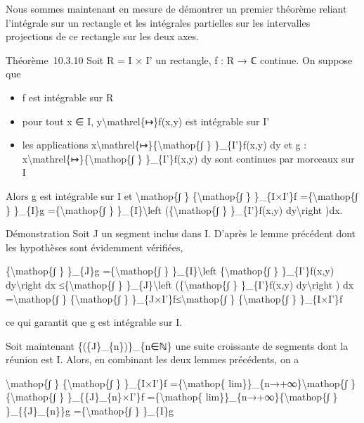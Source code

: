 \documentclass[]{article}
\begin{document}
Nous sommes maintenant en mesure de démontrer un premier théorème
reliant l'intégrale sur un rectangle et les intégrales partielles sur
les intervalles projections de ce rectangle sur les deux axes.

Théorème~10.3.10 Soit R = I × I' un rectangle, f : R → ℂ continue. On
suppose que

\begin{itemize}
\itemsep1pt\parskip0pt
\item
  f est intégrable sur R
\item
  pour tout x ∈ I, y\textbackslash{}mathrel\{↦\}f(x,y) est intégrable
  sur I'
\item
  les applications
  x\textbackslash{}mathrel\{↦\}\{\textbackslash{}mathop\{∫ \}
  \}\_\{I'\}\textbar{}f(x,y)\textbar{} dy et g :
  x\textbackslash{}mathrel\{↦\}\{\textbackslash{}mathop\{∫ \}
  \}\_\{I'\}f(x,y) dy sont continues par morceaux sur I
\end{itemize}

Alors g est intégrable sur I et \textbackslash{}mathop\{∫ \}
\{\textbackslash{}mathop\{∫ \} \}\_\{I×I'\}f
=\{\textbackslash{}mathop\{∫ \} \}\_\{I\}g =\{\textbackslash{}mathop\{∫
\} \}\_\{I\}\textbackslash{}left (\{\textbackslash{}mathop\{∫ \}
\}\_\{I'\}f(x,y) dy\textbackslash{}right )dx.

Démonstration Soit J un segment inclus dans I. D'après le lemme
précédent dont les hypothèses sont évidemment vérifiées,

\{\textbackslash{}mathop\{∫ \} \}\_\{J\}\textbar{}g\textbar{}
=\{\textbackslash{}mathop\{∫ \} \}\_\{I\}\textbackslash{}left
\textbar{}\{\textbackslash{}mathop\{∫ \} \}\_\{I'\}f(x,y)
dy\textbackslash{}right \textbar{} dx ≤\{\textbackslash{}mathop\{∫ \}
\}\_\{J\}\textbackslash{}left (\{\textbackslash{}mathop\{∫ \}
\}\_\{I'\}\textbar{}f(x,y)\textbar{} dy\textbackslash{}right ) dx
=\textbackslash{}mathop\{∫ \} \{\textbackslash{}mathop\{∫ \}
\}\_\{J×I'\}\textbar{}f\textbar{}≤\textbackslash{}mathop\{∫ \}
\{\textbackslash{}mathop\{∫ \} \}\_\{I×I'\}\textbar{}f\textbar{}

ce qui garantit que g est intégrable sur I.

Soit maintenant \{(\{J\}\_\{n\})\}\_\{n∈ℕ\} une suite croissante de
segments dont la réunion est I. Alors, en combinant les deux lemmes
précédents, on a

\textbackslash{}mathop\{∫ \} \{\textbackslash{}mathop\{∫ \}
\}\_\{I×I'\}f =\{\textbackslash{}mathop\{
lim\}\}\_\{n→+∞\}\textbackslash{}mathop\{∫ \}
\{\textbackslash{}mathop\{∫ \} \}\_\{\{J\}\_\{n\}×I'\}f
=\{\textbackslash{}mathop\{ lim\}\}\_\{n→+∞\}\{\textbackslash{}mathop\{∫
\} \}\_\{\{J\}\_\{n\}\}g =\{\textbackslash{}mathop\{∫ \} \}\_\{I\}g
\end{document}
